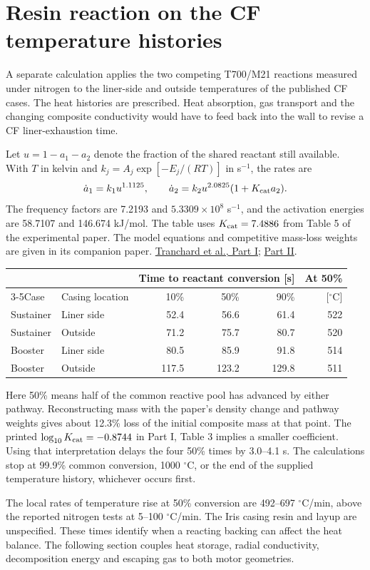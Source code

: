 \clearpage\section{Resin reaction on the CF temperature histories}\label{sec:cfdiag}
A separate calculation applies the two competing T700/M21 reactions measured
under nitrogen to the liner-side and outside temperatures of the published
CF cases. The heat histories are prescribed. Heat absorption, gas transport
and the changing composite conductivity would have to feed back into the wall
to revise a CF liner-exhaustion time.

Let $u=1-a_1-a_2$ denote the fraction of the shared reactant still available.
With $T$ in kelvin and $k_j=A_j\exp[-E_j/(RT)]$ in s$^{-1}$, the rates are
\[
 \dot a_1=k_1 u^{1.1125},\qquad \dot a_2=k_2 u^{2.0825}(1+K_{\rm cat} a_2).
\]
The frequency factors are 7.2193 and $5.3309\times10^8$ s$^{-1}$, and the
activation energies are 58.7107 and 146.674 kJ/mol. The table uses
$K_{\rm cat}=7.4886$ from Table 5 of the experimental paper. The model equations
and competitive mass-loss weights are given in its companion paper.
\href{https://doi.org/10.3390/ma10050494}{Tranchard et al., Part I};
\href{https://doi.org/10.3390/ma10050470}{Part II}.

\begin{table}[H]\centering\begin{tabular}{llrrrr}\toprule
 & & \multicolumn{3}{c}{Time to reactant conversion [s]} & At 50\%\\
\cmidrule(lr){3-5}Case & Casing location & 10\% & 50\% & 90\% & [$^\circ$C]\\\midrule
Sustainer & Liner side & 52.4 & 56.6 & 61.4 & 522 \\
Sustainer & Outside & 71.2 & 75.7 & 80.7 & 520 \\
Booster & Liner side & 80.5 & 85.9 & 91.8 & 514 \\
Booster & Outside & 117.5 & 123.2 & 129.8 & 511 \\
\bottomrule\end{tabular}\end{table}

Here 50\% means half of the common reactive pool has advanced by either
pathway. Reconstructing mass with the paper's density change and pathway
weights gives about 12.3\% loss of the initial composite mass at that point.
The printed $\log_{10} K_{\rm cat}=-0.8744$ in Part I, Table 3 implies
a smaller coefficient. Using that interpretation delays the four 50\% times
by 3.0--4.1 s. The calculations stop at 99.9\% common conversion, 1000
$^\circ$C, or the end of the supplied temperature history, whichever occurs first.

The local rates of temperature rise at 50\% conversion are 492--697
$^\circ$C/min, above the reported nitrogen tests at 5--100 $^\circ$C/min.
The Iris casing resin and layup are unspecified. These times identify when a
reacting backing can affect the heat balance. The following section couples heat storage, radial
conductivity, decomposition energy and escaping gas to both motor geometries.
\clearpage
